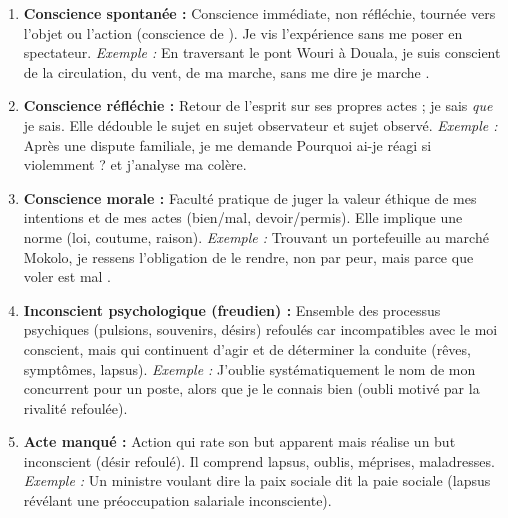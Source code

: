 \documentclass[11pt]{article}
\begin{document}
\begin{corrige}
\begin{enumerate}
\item \textbf{Conscience spontanée :} Conscience immédiate, non réfléchie, tournée vers l'objet ou l'action (\guillemotleft conscience de \guillemotright). Je vis l'expérience sans me poser en spectateur. \textit{Exemple :} En traversant le pont Wouri à Douala, je suis conscient de la circulation, du vent, de ma marche, sans me dire \guillemotleft je marche \guillemotright.
\item \textbf{Conscience réfléchie :} Retour de l'esprit sur ses propres actes ; je sais \emph{que} je sais. Elle dédouble le sujet en sujet observateur et sujet observé. \textit{Exemple :} Après une dispute familiale, je me demande \guillemotleft Pourquoi ai-je réagi si violemment ? \guillemotright et j'analyse ma colère.
\item \textbf{Conscience morale :} Faculté pratique de juger la valeur éthique de mes intentions et de mes actes (bien/mal, devoir/permis). Elle implique une norme (loi, coutume, raison). \textit{Exemple :} Trouvant un portefeuille au marché Mokolo, je ressens l'obligation de le rendre, non par peur, mais parce que \guillemotleft voler est mal \guillemotright.
\item \textbf{Inconscient psychologique (freudien) :} Ensemble des processus psychiques (pulsions, souvenirs, désirs) refoulés car incompatibles avec le moi conscient, mais qui continuent d'agir et de déterminer la conduite (rêves, symptômes, lapsus). \textit{Exemple :} J'oublie systématiquement le nom de mon concurrent pour un poste, alors que je le connais bien (oubli motivé par la rivalité refoulée).
\item \textbf{Acte manqué :} Action qui rate son but apparent mais réalise un but inconscient (désir refoulé). Il comprend lapsus, oublis, méprises, maladresses. \textit{Exemple :} Un ministre voulant dire \guillemotleft la paix sociale \guillemotright dit \guillemotleft la paie sociale \guillemotright (lapsus révélant une préoccupation salariale inconsciente).
\end{enumerate}
\end{corrige}
\end{document}
